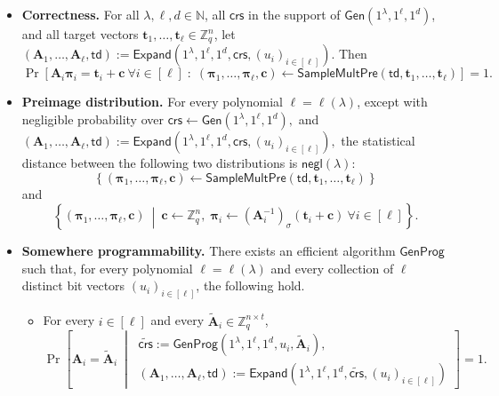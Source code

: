 \begin{itemize}
    \item \textbf{Correctness.} For all $\lambda,\ell,d\in\mathbb N$, all
$\mathsf{crs}$ in the support of $\mathsf{Gen}(1^\lambda,1^\ell,1^d )$,
and all target vectors
$\mathbf t_1,\ldots,\mathbf t_\ell\in\mathbb Z_q^n$, let
$
    (\mathbf A_1,\ldots,\mathbf A_\ell,\mathsf{td})
    :=
    \mathsf{Expand}
    (1^\lambda,1^\ell,1^d,\mathsf{crs},(u_i)_{i\in[\ell]}).
$
Then
\[
\Pr\left[
    \mathbf A_i\boldsymbol\pi_i=\mathbf t_i+\mathbf c
    \ \forall i\in[\ell]
    \;:\;
    (\boldsymbol\pi_1,\ldots,\boldsymbol\pi_\ell,\mathbf c)
    \leftarrow
    \mathsf{SampleMultPre}
    (\mathsf{td},\mathbf t_1,\ldots,\mathbf t_\ell)
\right]
=1 .
\]
\item \textbf{Preimage distribution.}
For every polynomial $\ell=\ell(\lambda)$, except with negligible probability
over
$
    \mathsf{crs}\leftarrow \mathsf{Gen}(1^\lambda,1^\ell,1^d),
$
and
$
    (\mathbf A_1,\ldots,\mathbf A_\ell,\mathsf{td})
    :=
    \mathsf{Expand}
    (1^\lambda,1^\ell,1^d,\mathsf{crs},(u_i)_{i\in[\ell]}),
$
the statistical distance between the following two distributions is
$\mathsf{negl}(\lambda)$:
\[
\left\{
    (\boldsymbol\pi_1,\ldots,\boldsymbol\pi_\ell,\mathbf c)
    \leftarrow
    \mathsf{SampleMultPre}
    (\mathsf{td},\mathbf t_1,\ldots,\mathbf t_\ell)
\right\}
\]
and
\[
\left\{
    (\boldsymbol\pi_1,\ldots,\boldsymbol\pi_\ell,\mathbf c)
    \ \middle|\
    \mathbf c\leftarrow \mathbb Z_q^n,\;
    \boldsymbol\pi_i
    \leftarrow
    (\mathbf A_i^{-1})_\sigma(\mathbf t_i+\mathbf c)
    \ \forall i\in[\ell]
\right\}.
\]

\item \textbf{Somewhere programmability.}
There exists an efficient algorithm $\mathsf{GenProg}$ such that, for every
polynomial $\ell=\ell(\lambda)$ and every collection of $\ell$ distinct bit
vectors $(u_i)_{i\in[\ell]}$, the following hold.
\begin{itemize}
     

\item For every $i\in[\ell]$ and every
$\widetilde{\mathbf A}_i\in\mathbb Z_q^{n\times t}$,
\[
\Pr\left[
    \mathbf A_i=\widetilde{\mathbf A}_i
    \ \middle|\
    \begin{array}{l}
    \widetilde{\mathsf{crs}}
    :=
    \mathsf{GenProg}
    (1^\lambda,1^\ell,1^d,u_i,\widetilde{\mathbf A}_i),\\[0.3em]
    (\mathbf A_1,\ldots,\mathbf A_\ell,\mathsf{td})
    :=
    \mathsf{Expand}
    (1^\lambda,1^\ell,1^d,\widetilde{\mathsf{crs}},
    (u_i)_{i\in[\ell]})
    \end{array}
\right]
=1 .
\]


\end{itemize}
\end{itemize}
